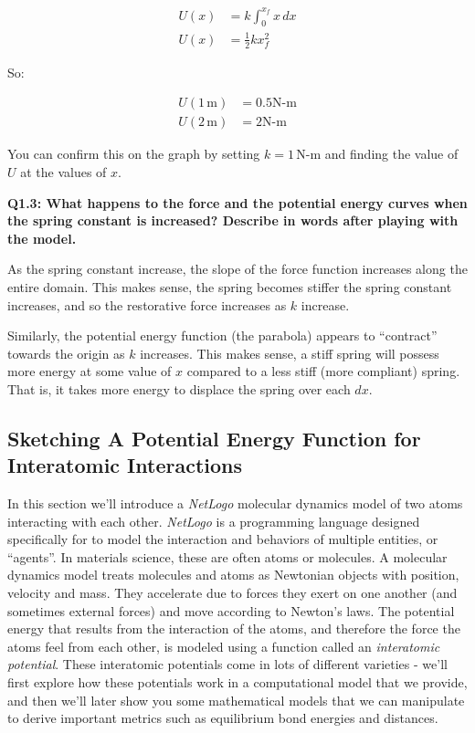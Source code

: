 \documentclass{book}
\begin{document}
\begin{align*}   U(x) &= k\int_0^{x_f} x\,dx\\   U(x) &= \frac{1}{2}kx_f^2 \end{align*}

So:

\begin{align*}   U(1\,\text{m}) &= 0.5\text{N-m}\\   U(2\,\text{m}) &= 2\text{N-m} \end{align*}

You can confirm this on the graph by setting \(k=1\,\text{N-m}\) and finding
the value of \(U\) at the values of \(x\).

\textbf{Q1.3: What happens to the force and the potential energy curves when
the spring constant is increased? Describe in words after playing with the
model.}

As the spring constant increase, the slope of the force function increases
along the entire domain. This makes sense, the spring becomes stiffer the
spring constant increases, and so the restorative force increases as \(k\)
increase.

Similarly, the potential energy function (the parabola) appears to
``contract'' towards the origin as \(k\) increases. This makes sense, a stiff
spring will possess more energy at some value of \(x\) compared to a less
stiff (more compliant) spring. That is, it takes more energy to displace the
spring over each \(dx\).

\hypertarget{sketching-a-potential-energy-function-for-interatomic-interactions}{%
\subsection{Sketching A Potential Energy Function for Interatomic
Interactions}\label{sketching-a-potential-energy-function-for-interatomic-interactions}}

In this section we'll introduce a \emph{NetLogo} molecular dynamics model of
two atoms interacting with each other. \emph{NetLogo} is a programming
language designed specifically for to model the interaction and behaviors of
multiple entities, or ``agents''. In materials science, these are often atoms
or molecules. A molecular dynamics model treats molecules and atoms as
Newtonian objects with position, velocity and mass. They accelerate due to
forces they exert on one another (and sometimes external forces) and move
according to Newton's laws. The potential energy that results from the
interaction of the atoms, and therefore the force the atoms feel from each
other, is modeled using a function called an \emph{interatomic potential}.
These interatomic potentials come in lots of different varieties - we'll first
explore how these potentials work in a computational model that we provide,
and then we'll later show you some mathematical models that we can manipulate
to derive important metrics such as equilibrium bond energies and distances.
\end{document}
